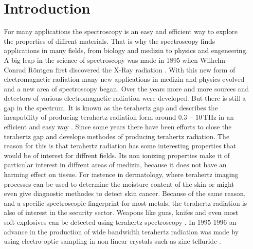 \chapter{Introduction}
For many applications the spectroscopy is an easy and efficient way to explore the properties of diffrent materials.
That is why the spectroscopy finds applications in many fields, from biology and medizin to physics and engeneering.
A big leap in the science of spectroscopy was made in 1895 when Wilhelm Conrad Röntgen first discovered the X-Ray radiation \cite{roentgen}.
With this new form of electromagnetic radiation many new applications in medizin and physics evolved and a new area of spectroscopy began.
Over the years more and more sources and detectors of various electromagnetic radiation were developed.
But there is still a gap in the spectrum.
It is known as the terahertz gap and describes the incapability of producing terahertz radiation form around $0.3-10\,\si{\tera\hertz}$ in an efficient and easy way \cite[157--159]{THzgap_applications}.
Since some years there have been efforts to close the terahertz gap and develope methodes of producing terahertz radiation.
The reason for this is that terahertz radiation has some interesting properties that would be of interest for diffrent fields.
Its non ionizing properties make it of particular interest in diffrent areas of medizin, because it does not have an harming effect on tissue\cite[161--162]{THzgap_applications}.
For instence in dermatology, where terahertz imaging processes can be used to determine the moisture content of the skin or might even give diagnostic methodes to detect skin cancer\cite{terahertz_dermatology}. 
Because of the same reason, and a specific spectroscopic fingerprint for most metals, the terahertz radiation is also of interest in the security sector.
Weapons like guns, knifes and even most soft explosives can be detected using terahertz spectroscopy \cite[162]{THzgap_applications}\cite{thz_explosive_detec}.
In 1995-1996 an advance in the production of wide bandwidth terahertz radiation was made by using electro-optic sampling in non linear crystals such as zinc telluride \cite{first_eos_wu_zhang}\cite{ZnTe_Nahata_Weling_1996}.



